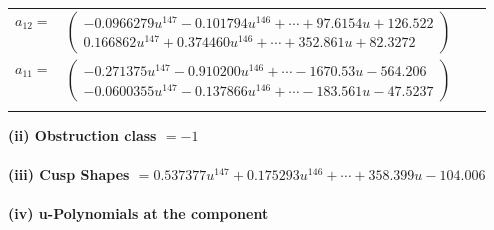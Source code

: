 \documentclass[1p]{elsarticle_modified}
\theoremstyle{definition}
\begin{document}
\begin{tabular}{m{7pt} m{180pt} m{7pt} m{180pt} }
\flushright $a_{12}=$&$\begin{pmatrix}-0.0966279 u^{147}-0.101794 u^{146}+\cdots+97.6154 u+126.522\\0.166862 u^{147}+0.374460 u^{146}+\cdots+352.861 u+82.3272\end{pmatrix}$ \\
\flushright $a_{11}=$&$\begin{pmatrix}-0.271375 u^{147}-0.910200 u^{146}+\cdots-1670.53 u-564.206\\-0.0600355 u^{147}-0.137866 u^{146}+\cdots-183.561 u-47.5237\end{pmatrix}$\\&\end{tabular}
\flushleft \textbf{(ii) Obstruction class $= -1$}\\~\\
\flushleft \textbf{(iii) Cusp Shapes $= 0.537377 u^{147}+0.175293 u^{146}+\cdots+358.399 u-104.006$}\\~\\
\newpage\renewcommand{\arraystretch}{1}
\flushleft \textbf{(iv) u-Polynomials at the component}\newline \\
\end{document}
